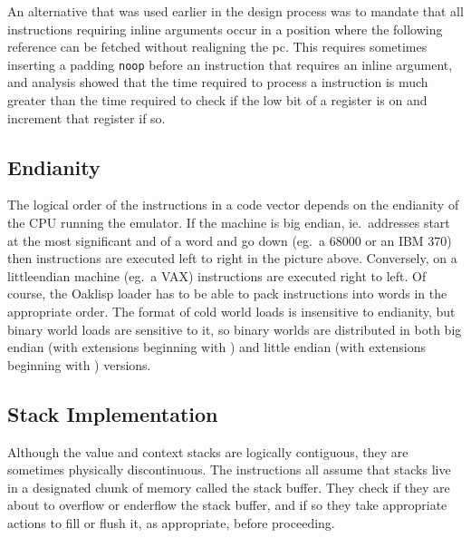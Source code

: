 An alternative that was used earlier in the design process was to
mandate that all instructions requiring inline arguments occur in a
position where the following reference can be fetched without
realigning the pc.  This requires sometimes inserting a padding
\texttt{noop} before an instruction that requires an inline argument,
and
analysis showed that the time required to process a 
instruction is much greater than the time required to check if the low
bit of a register is on and increment that register if so.


\subsection{Endianity}

The logical order of the instructions in a code vector depends on the
endianity of the CPU running the emulator.  If the machine is big
endian, ie.\ addresses start at the most significant and of a word and
go down (eg.\ a 68000 or an IBM 370) then instructions are executed
left to right in the picture above.  Conversely, on a littleendian
machine (eg.\ a VAX) instructions are executed right to left.  Of
course, the Oaklisp loader has to be able to pack instructions into
words in the appropriate order.  The format of cold world loads is
insensitive to endianity, but binary world loads are sensitive to it,
so binary worlds are distributed in both big endian (with extensions
beginning with ) and little endian (with extensions beginning
with ) versions.


\subsection{Stack Implementation} \label{sec:stackimpl}

Although the value and context stacks are logically contiguous, they
are sometimes physically discontinuous.  The instructions all assume
that stacks live in a designated chunk of memory called the stack
buffer.  They check if they are about to overflow or enderflow the
stack buffer, and if so they take appropriate actions to fill or flush
it, as appropriate, before proceeding.


